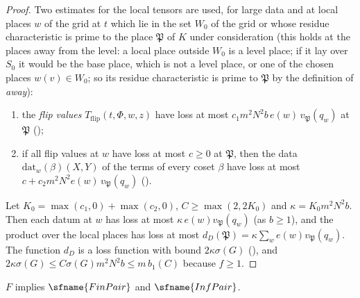 \begin{proof}
Two estimates for the local tensors are used, for large data and at local places $w$ of the grid at $t$ which lie in the set
$W_0$ of the grid or whose residue characteristic is prime to the place $\mathfrak P$ of $K$ under consideration (this holds at
the places away from the level: a local place outside $W_0$ is a level place; if it lay over $S_0$ it would be the base place,
which is not a level place, or one of the chosen places $w(v)\in W_0$; so its residue characteristic is prime to $\mathfrak P$ by
the definition of \emph{away}):
\begin{enumerate}[label=(\alph*)]
\item the \emph{flip values} $T_{\mathrm{flip}}(t,\Phi,w,z)$ have loss at most $c_1m^2N^2b\,e(w)\,v_{\mathfrak P}(q_w)$ at
$\mathfrak P$ ();
\item if all flip values at $w$ have loss at most $c\ge0$ at $\mathfrak P$, then the data $\mathrm{dat}_w(\beta)(X,Y)$ of the
terms of every coset $\beta$ have loss at most $c+c_2m^2N^2e(w)\,v_{\mathfrak P}(q_w)$
().
\end{enumerate}
Let $K_0=\max(c_1,0)+\max(c_2,0)$, $C\ge\max(2,2K_0)$ and $\kappa=K_0m^2N^2b$. Then each datum at $w$ has loss at most
$\kappa\,e(w)v_{\mathfrak P}(q_w)$ (as $b\ge1$), and the product over the local places has loss at most
$d_D(\mathfrak P)=\kappa\sum_we(w)v_{\mathfrak P}(q_w)$. The function $d_D$ is a loss function with bound $2\kappa\sigma(G)$
(), and $2\kappa\sigma(G)\le C\sigma(G)m^2N^2b\le m\,b_1(C)$ because $f\ge1$.
\end{proof}

\begin{theorem}\label{pf:fit:fieldpair}
$F$ implies $\sfname{FinPair}$ and $\sfname{InfPair}$.
\end{theorem}

